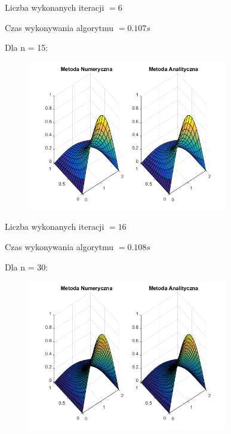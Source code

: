 Liczba wykonanych iteracji $ = 6 $

Czas wykonywania algorytmu $ = 0.107 s$

\newpage

Dla n = 15:

\begin{figure}[!ht]
	\begin{center}
		\includegraphics[width=0.78\textwidth]{Lab7/charts/cn/15.png}
	\end{center}
\end{figure}

Liczba wykonanych iteracji $ = 16 $

Czas wykonywania algorytmu $ = 0.108 s$

Dla n = 30:

\begin{figure}[!ht]
	\begin{center}
		\includegraphics[width=0.78\textwidth]{Lab7/charts/cn/30.png}
	\end{center}
\end{figure}

